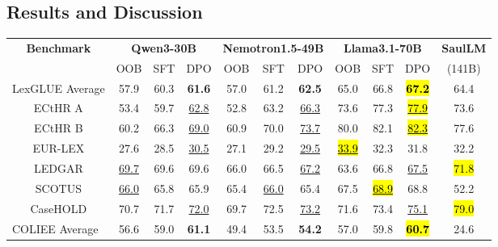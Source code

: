 
\subsection{Results and Discussion}
\label{section:results}

\begin{table}[ht]
  \centering
  \begin{threeparttable}
  \begin{tabular}{cccc|ccc|ccc|c}
    \hline
    \multirow{2}{*}{\textbf{Benchmark}} & \multicolumn{3}{c|}{\textbf{Qwen3-30B}} & \multicolumn{3}{c|}{\textbf{Nemotron1.5-49B}} & \multicolumn{3}{c|}{\textbf{Llama3.1-70B}} & \textbf{SaulLM} \\
    & OOB & SFT & DPO & OOB & SFT & DPO & OOB & SFT & DPO & (141B) \\ \hline
    \multicolumn{1}{l}{LexGLUE Average} & 57.9 & 60.3 & \textbf{61.6} & 57.0 & 61.2 & \textbf{62.5} & 65.0 & 66.8 & \hl{\textbf{67.2}} & 64.4 \\
    ECtHR A\tnote{$\bigstar$} & 53.4 & 59.7 & \underline{62.8} & 52.8 & 63.2 & \underline{66.3} & 73.6 & 77.3 & \underline{\hl{77.9}} & 73.6 \\
    ECtHR B\tnote{$\bigstar$} & 60.2 & 66.3 & \underline{69.0} & 60.9 & 70.0 & \underline{73.7} & 80.0 & 82.1 & \underline{\hl{82.3}} & 77.6 \\
    EUR-LEX\tnote{$\bigstar$} & 27.6 & 28.5 & \underline{30.5} & 27.1 & 29.2 & \underline{29.5} & \underline{\hl{33.9}} & 32.3 & 31.8 & 32.2 \\
    LEDGAR\tnote{$\bigstar$} & \underline{69.7} & 69.6 & 69.6 & 66.0 & 66.5 & \underline{67.2} & 63.6 & 66.8 & \underline{67.5} & \hl{71.8} \\
    SCOTUS\tnote{$\bigstar$} & \underline{66.0} & 65.8 & 65.9 & 65.4 & \underline{66.0} & 65.4 & 67.5 & \underline{\hl{68.9}} & 68.8 & 52.2 \\
    CaseHOLD\tnote{$\S$$\Diamond$} & 70.7 & 71.7 & \underline{72.0} & 69.7 & 72.5 & \underline{73.2} & 71.6 & 73.4 & \underline{75.1} & \hl{79.0} \\
   \hline
    \multicolumn{1}{l}{COLIEE Average} & 56.6 & 59.0 & \textbf{61.1} & 49.4 & 53.5 & \textbf{54.2} & 57.0 & 59.8 & \hl{\textbf{60.7}} & 24.6 \\

\end{tabular}
\end{threeparttable}
\end{table}
